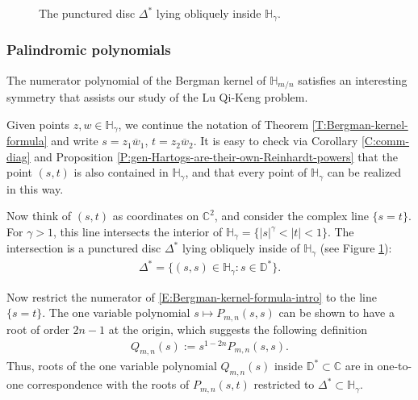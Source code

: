 \documentclass[letterpaper,11pt,reqno]{amsart}
\theoremstyle{plain}
\theoremstyle{definition}
\theoremstyle{remark}
\theoremstyle{remark}
\numberwithin{equation}{section}
\newcommand{\ol}{\overline}
\newcommand{\C}{{\mathbb C}}
\newcommand{\D}{{\mathbb D}}
\newcommand{\h}{{\mathbb H}}
\begin{document}
\begin{figure}
\centering
{} 
\caption{The punctured disc $\Delta^*$ lying obliquely inside $\h_\gamma$.}
\label{Fig:punctured-disc-Delta*}
\end{figure}

\subsubsection{Palindromic polynomials}\label{SSS:palidromic-polys}
The numerator polynomial of the Bergman kernel of $\h_{m/n}$ satisfies an interesting symmetry that assists our study of the Lu Qi-Keng problem.

Given points $z,w \in \h_\gamma$, we continue the notation of Theorem \ref{T:Bergman-kernel-formula} and write $s = z_1\ol{w}_1$, $t = z_2\ol{w}_2$.
It is easy to check via Corollary \ref{C:comm-diag} and Proposition \ref{P:gen-Hartogs-are-their-own-Reinhardt-powers} that the point $(s,t)$ is also contained in $\h_\gamma$, and that every point of $\h_\gamma$ can be realized in this way.

Now think of $(s,t)$ as coordinates on $\C^2$, and consider the complex line $\{s = t \}$.
For $\gamma>1$, this line intersects the interior of $\h_\gamma = \{|s|^\gamma < |t| < 1 \}$.
The intersection is a punctured disc $\Delta^*$ lying obliquely inside of $\h_\gamma$ (see Figure \ref{Fig:punctured-disc-Delta*}):
\begin{align*}
\Delta^* 
= \{(s,s) \in \h_\gamma : s \in \D^* \}.
\end{align*}


Now 
restrict the numerator of \eqref{E:Bergman-kernel-formula-intro} to the line $\{s=t\}$.
The one variable polynomial $s \mapsto P_{m,n}(s,s)$ can be shown to have a root of order $2n-1$ at the origin, which suggests the following definition 
\begin{align*}
Q_{m,n}(s) := s^{1-2n} P_{m,n}(s,s).
\end{align*}
Thus, roots of the one variable polynomial $Q_{m,n}(s)$ inside $\D^* \subset \C$ are in one-to-one correspondence with the roots of $P_{m,n}(s,t)$ restricted to $\Delta^* \subset \h_\gamma$.
\end{document}
